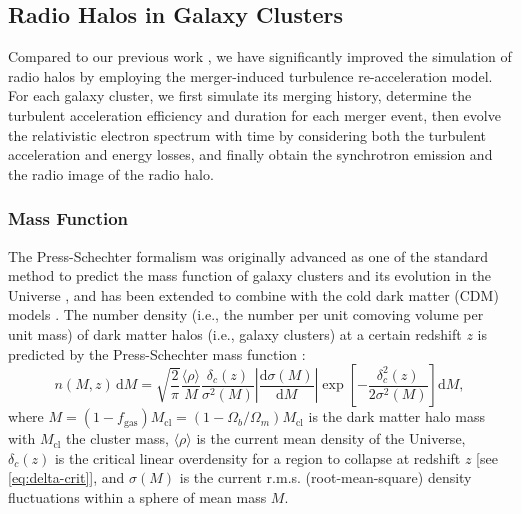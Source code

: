 \documentclass[modern]{aastex62}
\newcommand{\R}[1]{\mathrm{#1}}
\newcommand{\D}[1]{\R{d} #1}
\newcommand{\diff}[2]{\frac{\D{#1}}{\D{#2}}}
\begin{document}
\subsection{Radio Halos in Galaxy Clusters}
\label{sec:cluster-halo}

Compared to our previous work \citep{wang2010},
we have significantly improved the simulation of radio halos by
employing the merger-induced turbulence re-acceleration model.
For each galaxy cluster, we first simulate its merging history,
determine the turbulent acceleration efficiency and duration for each
merger event, then evolve the relativistic electron spectrum with time
by considering both the turbulent acceleration and energy losses, and
finally obtain the synchrotron emission and the radio image of the
radio halo.

\subsubsection{Mass Function}
\label{sec:distributions}

The Press-Schechter formalism was originally advanced as one of the standard
method to predict the mass function of galaxy clusters and its evolution
in the Universe \citep{press1974}, and has been extended to combine with
the cold dark matter (CDM) models \citep[e.g.,][]{bond1991,lacey1993}.
The number density (i.e., the number per unit comoving volume per unit
mass) of dark matter halos (i.e., galaxy clusters) at a certain redshift
$z$ is predicted by the Press-Schechter mass function \citep{press1974}:
\begin{equation}
  \label{eq:ps-mass-func}
  n(M, z) \,\D{M} = \sqrt{\frac{2}{\pi}} \frac{\langle{\rho}\rangle}{M}
  \frac{\delta_c(z)}{\sigma^2(M)} \left| \diff{\sigma(M)}{M} \right|
  \exp\!\left[ -\frac{\delta_c^2(z)}{2\sigma^2(M)} \right] \D{M},
\end{equation}
where
$M = (1 - f_{\R{gas}}) M_{\R{cl}} = (1 - \Omega_b/\Omega_m) M_{\R{cl}}$
is the dark matter halo mass with $M_{\R{cl}}$ the cluster mass,
$\langle {\rho} \rangle$ is the current mean density of the Universe,
$\delta_c(z)$ is the critical linear overdensity for a region to collapse
at redshift $z$ [see \autoref{eq:delta-crit}],
and $\sigma(M)$ is the current r.m.s. (root-mean-square) density fluctuations
within a sphere of mean mass $M$.
\end{document}
